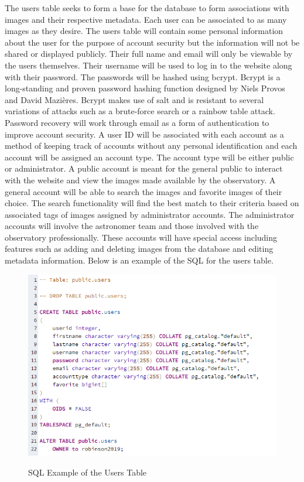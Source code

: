 \documentclass[12pt]{report}
\begin{document}
The users table seeks to form a base for the database to form associations with images and their respective metadata.  Each user can be associated to as many images as they desire.  The users table will contain some personal information about the user for the purpose of account security but the information will not be shared or displayed publicly.  Their full name and email will only be viewable by the users themselves.  Their username will be used to log in to the website along with their password.  The passwords will be hashed using bcrypt.  Bcrypt is a long-standing and proven password hashing function designed by Niels Provos and David Mazières.  Bcrypt makes use of salt and is resistant to several variations of attacks such as a brute-force search or a rainbow table attack.  Password recovery will work through email as a form of authentication to improve account security.
A user ID will be associated with each account as a method of keeping track of accounts without any personal identification and each account will be assigned an account type.  The account type will be either public or administrator.  A public account is meant for the general public to interact with the website and view the images made available by the observatory.  A general account will be able to search the images and favorite images of their choice.  The search functionality will find the best match to their criteria based on associated tags of images assigned by administrator accounts.  The administrator accounts will involve the astronomer team and those involved with the observatory professionally.  These accounts will have special access including features such as adding and deleting images from the database and editing metadata information.
Below is an example of the SQL for the users table.


\begin{figure}[h]
	\centering
	\caption{SQL Example of the Users Table}
	\includegraphics[width=\linewidth]{database_user_table}
	\label{fig:SQL Users Table}
\end{figure}
\end{document}
